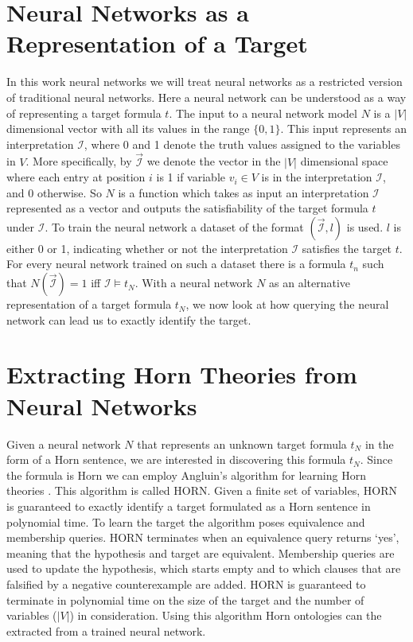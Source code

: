
\section{Neural Networks as a Representation of a Target}
In this work neural networks we will treat neural networks as a restricted version of traditional neural networks. Here a neural network can be understood as a way of representing a target formula $t$. The input to a neural network model $N$ is a $|V|$ dimensional vector with all its values in the range $\{0, 1\}$. This input represents an interpretation $\mathcal{I}$, where 0 and 1 denote the truth values assigned to the variables in $V$. More specifically, by $\overrightarrow{\mathcal{I}}$ we denote the vector in the $|V|$ dimensional space where each entry at position $i$ is 1 if variable $v_i \in V$ is in the interpretation $\mathcal{I}$, and 0 otherwise. So $N$ is a function which takes as input an interpretation $\mathcal{I}$ represented as a vector and outputs the satisfiability of the target formula $t$ under $\mathcal{I}$.
To train the neural network a dataset of the format $(\overrightarrow{\mathcal{I}}, l)$ is used. $l$ is either 0 or 1, indicating whether or not the interpretation $\mathcal{I}$ satisfies the target $t$. For every neural network trained on such a dataset there is a formula $t_n$ such that $N(\overrightarrow{\mathcal{I}}) = 1$ iff $\mathcal{I} \models t_N$. With a neural network $N$ as an alternative representation of a target formula $t_N$, we now look at how querying the neural network can lead us to exactly identify the target. 


\section{Extracting Horn Theories from Neural Networks}

Given a neural network $N$ that represents an unknown target formula $t_N$ in the form of a Horn sentence, we are interested in discovering this formula $t_N$. Since the formula is Horn we can employ Angluin's algorithm for learning Horn theories \cite{DBLP:journals/ml/AngluinFP92}. This algorithm is called HORN. Given a finite set of variables, HORN is guaranteed to exactly identify a target formulated as a Horn sentence in polynomial time. To learn the target the algorithm poses equivalence and membership queries. HORN terminates when an equivalence query returns `yes', meaning that the hypothesis and target are equivalent. Membership queries are used to update the hypothesis, which starts empty and to which clauses that are falsified by a negative counterexample are added. HORN is guaranteed to terminate in polynomial time on the size of the target and the number of variables ($|V|$) in consideration. Using this algorithm Horn ontologies can the extracted from a trained neural network.

